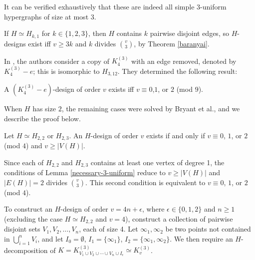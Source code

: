 It can be verified exhaustively that these are indeed all simple $3$-uniform hypergraphs of size at most 3.

If $H \simeq H_{k,1}$ for $k \in \{1, 2, 3\}$, then $H$ contains $k$ pairwise disjoint edges, so $H$-designs exist iff $v \geq 3k$ and $k$ divides ${v \choose 3}$, by Theorem \ref{baranyai}.

In \cite{feng-chang2}, the authors consider a copy of $K_4^{(3)}$ with an edge removed, denoted by $K_4^{(3)} - e$; this is isomorphic to $H_{3,12}$. They determined the following result:

\begin{theorem} \label{thm:H_3,12}
A $(K_4^{(3)}-e)$-design of order $v$ exists iff $v \equiv 0$,$1$, or $2$ (mod $9$).
\end{theorem}

When $H$ has size $2$, the remaining cases were solved by Bryant et al., and we describe the proof below.

\begin{theorem} \label{thm:H_22,H_23}
Let $H \simeq H_{2,2}$ or $H_{2,3}$.
An $H$-design of order $v$ exists if and only if $v \equiv 0$, $1$, or $2$ (mod $4$) and $v \geq |V(H)|$.
\end{theorem}

Since each of $H_{2,2}$ and $H_{2,3}$ contains at least one vertex of degree 1, the conditions of Lemma \ref{necessary-3-uniform}
reduce to $v \geq |V(H)|$ and $|E(H)| = 2$ divides ${v \choose 3}$. This second condition is equivalent to $v \equiv 0$, $1$, or $2$ (mod $4$).

To construct an $H$-design of order $v = 4n + \epsilon$, where $\epsilon \in \{0,1,2\}$ and $n \geq 1$
(excluding the case $H \simeq H_{2,2}$ and $v = 4$), construct a collection of pairwise disjoint sets
$V_1, V_2, \ldots, V_n$, each of size 4. Let $\infty_1, \infty_2$ be two points not contained in
$\bigcup_{i=1}^{n} V_i$, and let $I_0 = \emptyset$, $I_1 = \{\infty_1\}$, $I_2 = \{\infty_1, \infty_2\}$.
We then require an $H$-decomposition of $K = K_{V_1 \cup V_2 \cup \cdots \cup V_n \cup I_\epsilon}^{(3)} \simeq K_{v}^{(3)}$.

